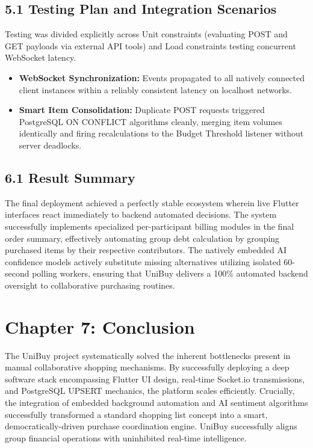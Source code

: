 \documentclass[a4paper,12pt]{article}
\begin{document}
\subsection*{5.1 Testing Plan and Integration Scenarios}
Testing was divided explicitly across Unit constraints (evaluating POST and GET payloads via external API tools) and Load constraints testing concurrent WebSocket latency.
\begin{itemize}
    \item \textbf{WebSocket Synchronization:} Events propagated to all natively connected client instances within a reliably consistent latency on localhost networks.
    \item \textbf{Smart Item Consolidation:} Duplicate POST requests triggered PostgreSQL ON CONFLICT algorithms cleanly, merging item volumes identically and firing recalculations to the Budget Threshold listener without server deadlocks.
\end{itemize}

\subsection*{6.1 Result Summary}
The final deployment achieved a perfectly stable ecosystem wherein live Flutter interfaces react immediately to backend automated decisions. The system successfully implements specialized per-participant billing modules in the final order summary, effectively automating group debt calculation by grouping purchased items by their respective contributors. The natively embedded AI confidence models actively substitute missing alternatives utilizing isolated 60-second polling workers, ensuring that UniBuy delivers a 100\% automated backend oversight to collaborative purchasing routines.

\newpage
\section*{Chapter 7: Conclusion}

The UniBuy project systematically solved the inherent bottlenecks present in manual collaborative shopping mechanisms. By successfully deploying a deep software stack encompassing Flutter UI design, real-time Socket.io transmissions, and PostgreSQL UPSERT mechanics, the platform scales efficiently. Crucially, the integration of embedded background automation and AI sentiment algorithms successfully transformed a standard shopping list concept into a smart, democratically-driven purchase coordination engine. UniBuy successfully aligns group financial operations with uninhibited real-time intelligence.
\end{document}
